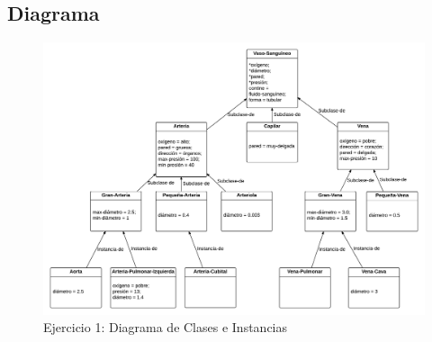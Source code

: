 \documentclass[10pt, a4paper,spanish]{article}
\begin{document}
			\begin{figure}[H]
				\centering
        
			\end{figure}

			\begin{figure}[H]
				\centering
        
			\end{figure}

			\begin{figure}[H]
				\centering
        
			\end{figure}

			\begin{figure}[H]
				\centering
        
			\end{figure}

			\begin{figure}[H]
				\centering
        
			\end{figure}

		\subsection{Diagrama}

			\begin{figure}[H]
				\begin{center}
					\includegraphics[width=\textwidth]{exercise-1-diagram}
					\caption{Ejercicio 1: Diagrama de Clases e Instancias}
					\label{image:diagram-1}
				\end{center}
			\end{figure}
\end{document}
